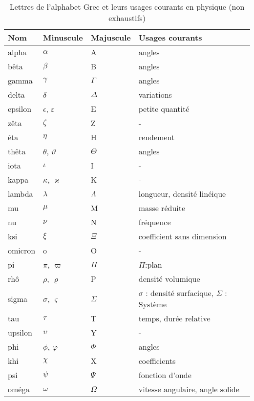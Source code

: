 \begin{table}[!h]
    \begin{tabular}{@{}P{1.75cm}P{1.75cm}P{1.75cm}P{4.75cm}@{}}
    \toprule
    Nom & Minuscule & Majuscule & Usages courants \\
    \midrule
    alpha & $\alpha$ & A  & angles \\
    bêta  & $\beta$  & B  & angles \\
    gamma & $\gamma$ & $\Gamma$ & angles \\
    delta & $\delta$ & $\Delta$ & variations \\
    epsilon & $\epsilon$, $\varepsilon$ & E & petite quantité \\
    zêta & $\zeta$ & Z & -  \\
    êta & $\eta$ & H & rendement \\
    thêta & $\theta$, $\vartheta$  & $\Theta$ & angles \\
    iota & $\iota$ & I & - \\
    kappa & $\kappa$, $\varkappa$ & K & - \\
    lambda & $\lambda$ & $\Lambda$ & longueur, densité linéique \\
    mu & $\mu$ & M & masse réduite \\
    nu & $\nu$ & N & fréquence \\
    ksi & $\xi$ & $\Xi$ & coefficient sans dimension \\
    omicron & o & O & - \\
    pi & $\pi$, $\varpi$ & $\Pi$ & $\Pi$:plan \\
    rhô & $\rho$, $\varrho$ & P & densité volumique \\
    sigma & $\sigma$, 
          $\varsigma$ & $\Sigma$ & $\sigma$ : densité surfacique, 
                                     $\Sigma$ : Système  \\
    tau & $\tau$ & T & temps, durée relative  \\
    upsilon & $\upsilon$ & Y & -  \\
    phi & $\phi$, $\varphi$ & $\Phi$ & angles   \\
    khi & $\chi$ & X  & coefficients   \\
    psi & $\psi$ & $\Psi$ & fonction d'onde   \\
    oméga & $\omega$ & $\Omega$ & vitesse angulaire, angle solide   \\
    \bottomrule
    \end{tabular}
    \caption{Lettres de l'alphabet Grec et leurs usages courants 
             en physique (non exhaustifs)}
\end{table}
